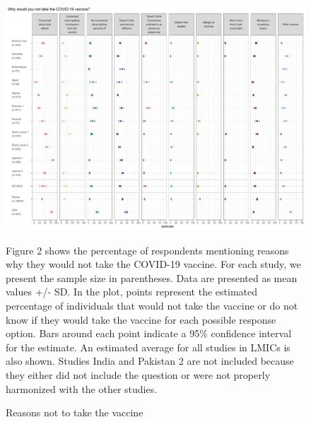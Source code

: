 \documentclass[
  12pt,
]{article}
\begin{document}
\begin{figure}[!ht]
\caption{Reasons not to take the vaccine \label{fig:fig2paper}}

\includegraphics{paper_files/figure-latex/fig2paper-1.pdf}

\scriptsize{Figure 2 shows the percentage of respondents mentioning reasons why they would not take the COVID-19 vaccine. For each study, we present the sample size in parentheses. Data are presented as mean values +/- SD. In the plot, points represent the estimated percentage of individuals that would not take the vaccine or do not know if they would take the vaccine for each possible response option. Bars around each point indicate a 95\% confidence interval for the estimate. An estimated average for all studies in LMICs is also shown. Studies India and Pakistan 2 are not included because they either did not include the question or were not properly harmonized with the other studies.}
\end{figure}
\end{document}
